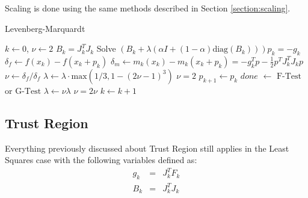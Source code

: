 \documentclass[peerreview,compsoc,onecolumn]{IEEEtran}
\begin{document}
Scaling is done using the same methods described in Section \ref{section:scaling}.

\begin{algorithm}{}
\caption{\label{alg:levenberg_marquardt}Levenberg-Marquardt}
\begin{algorithmic}[1]
	\State $k \gets 0$, $\nu \gets 2$
  	\State $B_k = J_k^T J_k$
		\State Solve $\left(B_k + \lambda \left(\alpha I + (1-\alpha)\mbox{diag}(B_k) \right)\right) p_k = -g_k$ 
		\State $\delta_f \gets f(x_k) - f(x_k + p_k)$ 
		\State $\delta_m \gets m_k(x_k)-m_k(x_k + p_k) = -g^T_k p - \frac{1}{2}p^T J_k^T J_k p$ 
		\State $\nu \gets \delta_f / \delta_f$  
		 
			\State $\lambda \gets \lambda \cdot \mbox{max}(1/3 , 1-(2\nu-1)^3)$
			\State $\nu = 2$
			\State $p_{k+1} \gets p_k$
			\State $done$ $\gets$ $\mbox{F-Test}$ or $\mbox{G-Test}$ 
		\Else
			\State $\lambda \gets \nu \lambda$ 
			\State $\nu = 2\nu$
		\EndIf
		\State $k \gets k + 1$
	\EndWhile
\end{algorithmic}
\end{algorithm}


\subsection{Trust Region}
 Everything previously discussed about Trust Region still applies in the Least Squares case with the following variables defined as:
\begin{eqnarray}
g_k &=& J^T_k F_k  \\
B_k &=& J_k^T J_k
\end{eqnarray}



\end{document}
